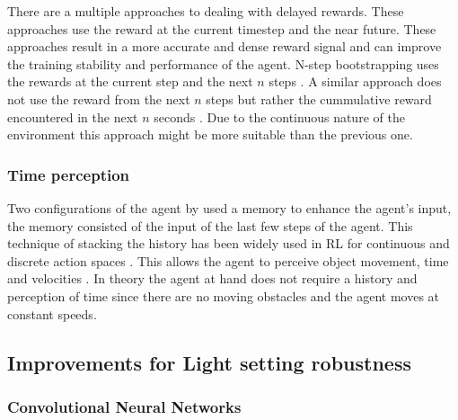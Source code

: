 There are a multiple approaches to dealing with delayed rewards. These approaches use the reward at the current timestep and the near future. These approaches result in a more accurate and dense reward signal and can improve the training stability and performance of the agent.
N-step bootstrapping uses the rewards at the current step and the next \(n\) steps \autocite{nstepbootstrapping}.  
A similar approach does not use the reward from the next \(n\) steps but rather the cummulative reward encountered in the next \(n\) seconds \autocite{trackmania}. Due to the continuous nature of the environment this approach might be more suitable than the previous one.


\subsubsection{Time perception}

Two configurations of the agent by \autocite{maximilian} used a memory to enhance the agent's input, the memory consisted of the input of the last few steps of the agent. This technique of stacking the history has been widely used in RL for continuous \autocite{atari} and discrete action spaces \autocite{alphago}. This allows the agent to perceive object movement, time and velocities \autocite{atari}.
In theory the agent at hand does not require a history and perception of time since there are no moving obstacles and the agent moves at constant speeds.




\subsection{Improvements for Light setting robustness}

\subsubsection{Convolutional Neural Networks}

